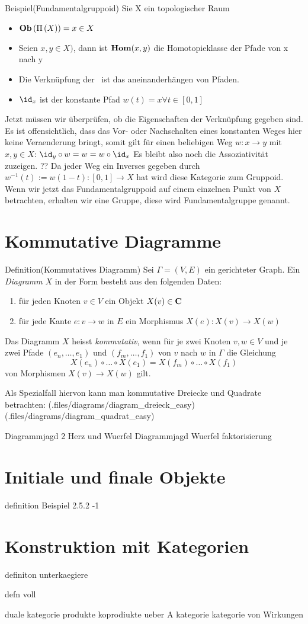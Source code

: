 \documentclass{article}
\begin{document}
		 
		 Beispiel(Fundamentalgruppoid)\cite[ Aufgabe 2.24 ]{Bra}
		 Sie X ein topologischer Raum
		\begin{itemize}
			\item \( \mathbf{Ob}  \left( \Pi \left( X \right) \right) = x \in X \)
			 \item Seien \( x ,y \in X ) \), dann ist \(  \mathbf{Hom } (x,y) \) die Homotopieklasse der Pfade von x nach y
			 \item Die Verkn\"upfung der \Hom \ ist das aneinanderh\"angen von Pfaden.
			 \item \(  \id_x \) ist der konstante Pfad \( w(t)=x \forall t \in [0,1] \)
		\end{itemize}
		Jetzt m\"ussen wir \"uberpr\"ufen, ob die Eigenschaften der Verkn\"upfung gegeben sind.
		Es ist offensichtlich, dass das Vor- oder Nachschalten eines konstanten Weges hier keine Veraenderung bringt, somit gilt f\"ur einen beliebigen Weg 
		\(w:x \to y \) mit \( x,y \in X\):
		\( \id_y \circ w = w = w \circ \id_x \)
		Es bleibt also noch die Assoziativit\"at zuzeigen.
		??
		Da jeder Weg ein Inverses gegeben durch \( w^{-1}(t):=w(1-t): [0,1] \to X \) hat wird diese Kategorie zum Gruppoid.
		Wenn wir jetzt das Fundamentalgruppoid auf einem einzelnen Punkt von \( X \) betrachten, erhalten wir eine Gruppe, diese wird Fundamentalgruppe genannt.
		
	
	\section{Kommutative Diagramme}
		Definition(Kommutatives Diagramm) \cite[Definition 2.4.3]{Bra}
		Sei \(\Gamma =(V,E) \) ein gerichteter Graph. Ein  \emph{Diagramm} $X$ in der Form \Gamma besteht aus den folgenden Daten:
		\begin{enumerate}
			\item f\"ur jeden Knoten \( v \in V \) ein  Objekt \( X(v) \in \mathbf{C} \)
			\item f\"ur jede Kante \( e:v \to w \) in \( E \) ein Morphismus \( X(e):X(v) \to X(w) \)  
		\end{enumerate}
		Das Diagramm $X$ heisst \emph{kommutativ}, wenn f\"ur je zwei Knoten \(v,w \in V \) und je zwei Pfade \( \left(e_n, \dots ,e_1\right) \) und \( \left(f_m, \dots ,f_1\right) \) von $v $ nach $w$ in $\Gamma $ die Gleichung 
		\[
			X(e_n) \circ \dots \circ X(e_1) = X(f_m) \circ \dots \circ X(f_1)
		\]
		von Morphismen \( X(v) \to X(w) \) gilt.
		
		Als Spezialfall hiervon kann man kommutative Dreiecke und Quadrate betrachten:
		(.files/diagrams/diagram_dreieck_easy)
		(.files/diagrams/diagram_quadrat_easy)		 

Diagrammjagd 2
Herz und Wuerfel
Diagrammjagd Wuerfel
faktorisierung


\section{Initiale und finale Objekte}
definition
Beispiel 2.5.2 -1

\section{Konstruktion mit Kategorien}
definiton unterkaegiere

defn voll

duale kategorie 
produkte
koprodiukte
ueber A kategorie
kategorie von Wirkungen
\end{document}
